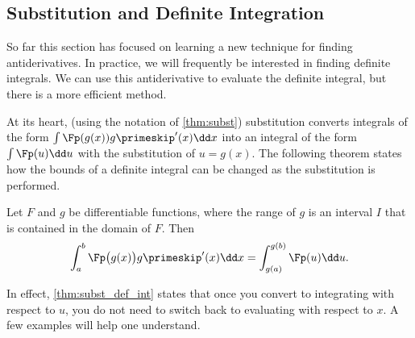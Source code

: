 \subsection{Substitution and Definite Integration}

So far this section has focused on learning a new technique for finding antiderivatives. In practice, we will frequently be interested in finding definite integrals. We can use this antiderivative to evaluate the definite integral, but there is a more efficient method.

At its heart, (using the notation of \autoref{thm:subst}) substitution converts integrals of the form $\int \Fp(g(x))g\primeskip'(x)\dd x$ into an integral of the form $\int \Fp(u)\dd u$ with the substitution of $u = g(x)$. The following theorem states how the bounds of a definite integral can be changed as the substitution is performed.

\begin{theorem}\label{thm:subst_def_int}%
Let $F$ and $g$ be differentiable functions, where the range of $g$ is an interval $I$ that is contained in the domain of $F$. Then 
\[\int_a^b \Fp\bigl(g(x)\bigr)g\primeskip'(x)\dd x = \int_{g(a)}^{g(b)} \Fp(u)\dd u.\]
\end{theorem}

In effect, \autoref{thm:subst_def_int} states that once you convert to integrating with respect to $u$, you do not need to switch back to evaluating with respect to $x$. A few examples will help one understand.


